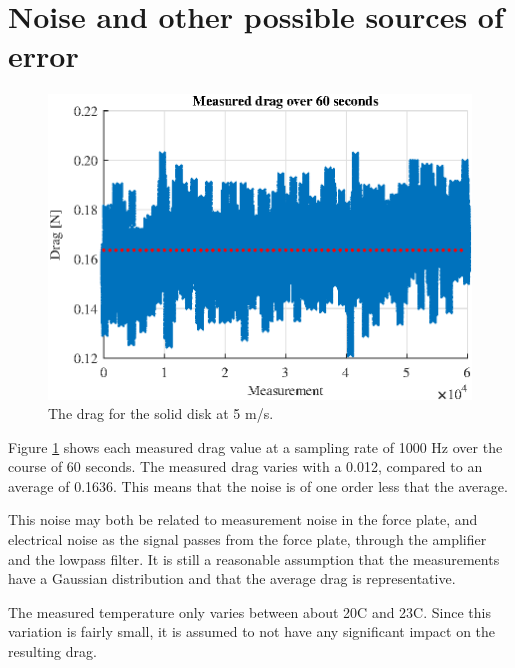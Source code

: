 
\section{Noise and other possible sources of error}

\begin{figure}[h!]
    \centering
    \includegraphics[width=\linewidth]{0_Images/NoiseFirst.eps}
    \caption{The drag for the solid disk at 5 m/s.}
    \label{fig:Noise}
\end{figure}

Figure \ref{fig:Noise} shows each measured drag value at a sampling rate of 1000 Hz over the course of 60 seconds. The measured drag varies with a 0.012, compared to an average of 0.1636. This means that the noise is of one order less that the average. 

This noise may both be related to measurement noise in the force plate, and electrical noise as the signal passes from the force plate, through the amplifier and the lowpass filter. It is still a reasonable assumption that the measurements have a Gaussian distribution and that the average drag is representative. 

The measured temperature only varies between about 20\degree C and 23\degree C. Since this variation is fairly small, it is assumed to not have any significant impact on the resulting drag. 








